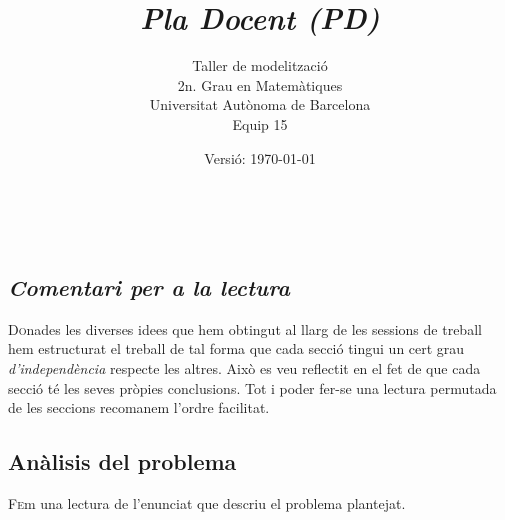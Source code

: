 \documentclass[10pt,twocolumn]{article}
\title{\emph{\color{redviolet!75!black}Pla Docent {(PD)}}}
\author{ Taller de modelització \\ 2n. Grau en  Matemàtiques \\ Universitat Autònoma de Barcelona \\ Equip 15 \\ }
\date{Versió: \today}
\newcommand{\esp}{\text{ }}
\begin{document}
	
\maketitle
{
\centering
\begin{abstract}
	
\end{abstract}
}
\newpage
$$
\esp
$$
\\ 
\newpage

\tableofcontents
\vspace{5mm}
\newpage
\begin{tcolorbox}[colframe=white,colback=redviolet!20,sharp corners=all,size=minimal,halign=center,valign=center]
	\section{\textit{Comentari per a la lectura}}
\end{tcolorbox}
\lettrine{D}onades les  diverses idees  que hem obtingut al llarg de les sessions de treball hem estructurat el treball de tal forma que cada secció tingui un cert grau \textit{d'independència} respecte les altres. Això es veu reflectit en el fet de que cada secció té les seves pròpies conclusions. Tot i poder fer-se una lectura permutada de les seccions recomanem l'ordre facilitat. 
\\ 
\newpage
\begin{tcolorbox}[colframe=white,colback=redviolet!20,sharp corners=all,size=minimal,halign=center,valign=center]
\section{Anàlisis del problema}
\end{tcolorbox}
\lettrine{F}em una lectura de l'enunciat que descriu el problema plantejat. 
\end{document}
